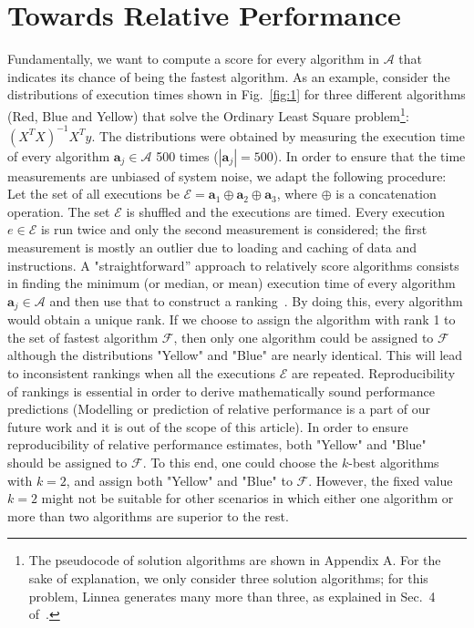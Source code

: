 \documentclass[conference]{IEEEtran}
\begin{document}
\section{Towards Relative Performance}
\label{sec:torel}
Fundamentally, we want to compute a score for every algorithm in $\mathcal{A}$ that indicates its chance of being the fastest algorithm. As an example, consider the distributions of execution times shown in Fig.~\ref{fig:1} for three different algorithms (Red, Blue and
Yellow) that solve the Ordinary Least Square problem\footnote{The pseudocode of solution algorithms are shown in Appendix A. For the sake of
  explanation, we only consider three solution algorithms; for this problem, Linnea generates many more than three,
  as explained in Sec.~4 of~\cite{barthels2019linnea}.}: $(X^TX)^{-1}X^{T}y$. 
The distributions were obtained by measuring the execution time of every algorithm $\mathbf{a}_j \in \mathcal{A}$ 500 times ($|\mathbf{a}_j| = 500$).
In order to ensure that the time measurements are unbiased of system noise, we adapt the following procedure: Let the set of all executions be $\mathcal{E} = \mathbf{a}_1 \oplus \mathbf{a}_2 \oplus \mathbf{a}_3$, where $\oplus$
is a concatenation operation. The set $\mathcal{E}$ is shuffled and the executions are timed. Every execution $e \in
\mathcal{E}$ is run twice and only the second measurement is considered; the first measurement is mostly an outlier due
to loading and caching of data and instructions\cite{peise2019elaps}. 
A "straightforward'' approach to relatively score algorithms consists in finding the minimum (or median, or mean) execution time of every algorithm $\mathbf{a}_j \in \mathcal{A}$ and then use that to construct a ranking~\cite{peise2012performance}. By doing this, every algorithm
  would obtain a unique rank. If we choose to assign the algorithm with rank 1 to the set of fastest algorithm $\mathcal{F}$, then only one algorithm could be assigned to $\mathcal{F}$ although the distributions "Yellow" and "Blue" are nearly identical. This will lead to inconsistent rankings when all the executions $\mathcal{E}$ are repeated. Reproducibility of rankings is essential in order to derive mathematically sound performance predictions (Modelling or prediction of relative performance is a part of our future work and it is out of the scope of this article).  In order to ensure reproducibility of relative performance estimates, both "Yellow" and "Blue" should be assigned to $\mathcal{F}$. 
  To this end, one could choose the $k$-best algorithms\cite{kbest-kadioglu2011algorithm} with $k=2$, and  assign both
  "Yellow" and "Blue" to $\mathcal{F}$. However, the fixed value $k=2$  might not be
  suitable for other scenarios in which either one algorithm or more than two algorithms are superior to the rest. 
\end{document}
